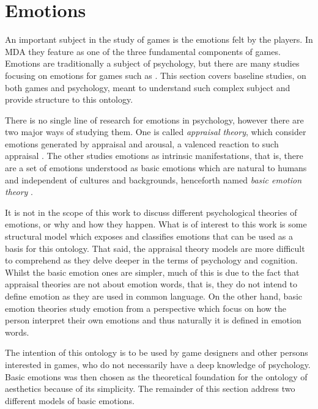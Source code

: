 \section{Emotions}
An important subject in the study of games is the emotions felt by the players. In MDA they feature as one of the three fundamental components of games. Emotions are traditionally a subject of psychology, but there are many studies focusing on emotions for games such as \cite{dillon_way_2010,bateman_implicit_2015,angelides_empirical_2014,karpouzis_emotion_2016}. This section covers baseline studies, on both games and psychology, meant to understand such complex subject and provide structure to this ontology.

There is no single line of research for emotions in psychology, however there are two major ways of studying them. One is called \textit{appraisal theory}, which consider emotions generated by appraisal and arousal, a valenced reaction to such appraisal \citep{ortony1990cognitive,scherer_appraisal_2001}. The other studies emotions as intrinsic manifestations, that is, there are a set of emotions understood as basic emotions which are natural to humans and independent of cultures and backgrounds, henceforth named \textit{basic emotion theory} \citep{ekman_are_basic_emotions_nodate,ekman_what_scientist_agree_2016}.

It is not in the scope of this work to discuss different psychological theories of emotions, or why and how they happen. What is of interest to this work is some structural model which exposes and classifies emotions that can be used as a basis for this ontology. That said, the appraisal theory models are more difficult to comprehend as they delve deeper in the terms of psychology and cognition. Whilst the basic emotion ones are simpler, much of this is due to the fact that appraisal theories are not about emotion words, that is, they do not intend to define emotion as they are used in common language. On the other hand, basic emotion theories study emotion from a perspective which focus on how the person interpret their own emotions and thus naturally it is defined in emotion words. 

The intention of this ontology is to be used by game designers and other persons interested in games, who do not necessarily have a deep knowledge of psychology. Basic emotions was then chosen as the theoretical foundation for the ontology of aesthetics because of its simplicity. The remainder of this section address two different models of basic emotions.


